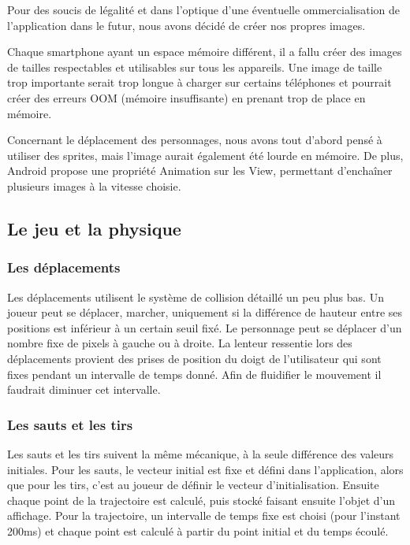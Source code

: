\documentclass{report}
\begin{document}
Pour des soucis de légalité et dans l’optique d’une éventuelle
ommercialisation de l’application dans le futur, nous avons décidé de
créer nos propres images.

Chaque smartphone ayant un espace mémoire différent, il a fallu créer
des images de tailles respectables et utilisables sur tous les
appareils. Une image de taille trop importante serait trop longue à
charger sur certains téléphones et pourrait créer des erreurs OOM
(mémoire insuffisante) en prenant trop de place en mémoire.

Concernant le déplacement des personnages, nous avons tout d’abord pensé
à utiliser des sprites, mais l’image aurait également été lourde en
mémoire. De plus, Android propose une propriété Animation sur les View,
permettant d'enchaîner plusieurs images à la vitesse choisie.

\subsection{Le jeu et la physique}
\bigskip


\subsubsection{Les déplacements}

Les déplacements utilisent le système de collision détaillé un peu plus
bas. Un joueur peut se déplacer, marcher, uniquement si la différence de
hauteur entre ses positions est inférieur à un certain seuil fixé. Le
personnage peut se déplacer d’un nombre fixe de pixels à gauche ou à
droite. La lenteur ressentie lors des déplacements provient des prises
de position du doigt de l’utilisateur qui sont fixes pendant un
intervalle de temps donné. Afin de fluidifier le mouvement il faudrait
diminuer cet intervalle.

\subsubsection{Les sauts et les tirs}
Les sauts et les tirs suivent la même mécanique, à la seule différence
des valeurs initiales. Pour les sauts, le vecteur initial est fixe et
défini dans l’application, alors que pour les tirs, c’est au joueur de 
définir le vecteur d’initialisation. Ensuite chaque point de la 
trajectoire est calculé, puis stocké faisant ensuite l’objet d’un 
affichage. Pour la trajectoire, un intervalle de temps fixe est choisi 
(pour l’instant 200ms) et chaque point est calculé à partir du point 
initial et du temps écoulé.
\end{document}
